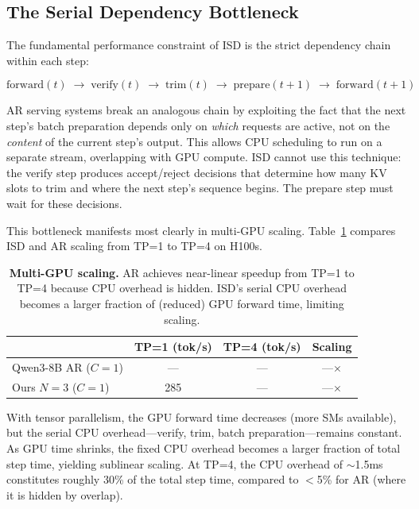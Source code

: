 \subsection{The Serial Dependency Bottleneck}
\label{sec:serial_bottleneck}

The fundamental performance constraint of ISD is the strict dependency chain within each step:

\vspace{-4pt}
\begin{equation*}
\text{forward}(t) \;\to\; \text{verify}(t) \;\to\; \text{trim}(t) \;\to\; \text{prepare}(t{+}1) \;\to\; \text{forward}(t{+}1)
\end{equation*}
\vspace{-4pt}

AR serving systems break an analogous chain by exploiting the fact that the next step's batch preparation depends only on \emph{which} requests are active, not on the \emph{content} of the current step's output. This allows CPU scheduling to run on a separate stream, overlapping with GPU compute. ISD cannot use this technique: the verify step produces accept/reject decisions that determine how many KV slots to trim and where the next step's sequence begins. The prepare step must wait for these decisions.

This bottleneck manifests most clearly in multi-GPU scaling. Table~\ref{tab:tp_scaling} compares ISD and AR scaling from TP=1 to TP=4 on H100s.

\begin{table}[t]
\centering
\caption{\textbf{Multi-GPU scaling.} AR achieves near-linear speedup from TP=1 to TP=4 because CPU overhead is hidden. ISD's serial CPU overhead becomes a larger fraction of (reduced) GPU forward time, limiting scaling.}
\label{tab:tp_scaling}
\small
\begin{tabular}{lccc}
\toprule
& \textbf{TP=1 (tok/s)} & \textbf{TP=4 (tok/s)} & \textbf{Scaling} \\
\midrule
Qwen3-8B AR ($C{=}1$) & --- & --- & ---$\times$ \\
Ours $N{=}3$ ($C{=}1$) & 285 & --- & ---$\times$ \\
\bottomrule
\end{tabular}
\end{table}

With tensor parallelism, the GPU forward time decreases (more SMs available), but the serial CPU overhead---verify, trim, batch preparation---remains constant. As GPU time shrinks, the fixed CPU overhead becomes a larger fraction of total step time, yielding sublinear scaling. At TP=4, the CPU overhead of ${\sim}$1.5ms constitutes roughly 30\% of the total step time, compared to $<$5\% for AR (where it is hidden by overlap).

